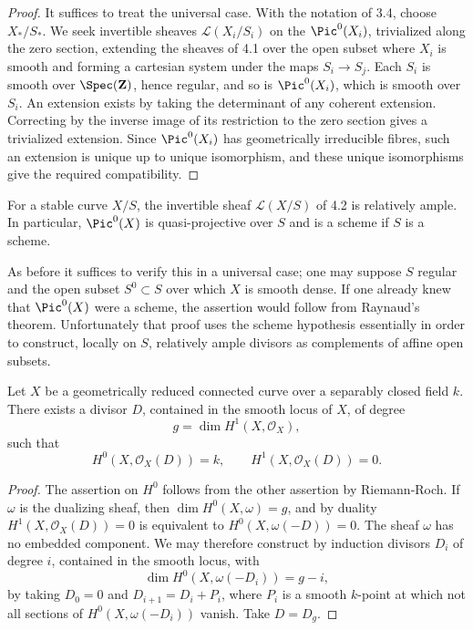 \begin{proof}
It suffices to treat the universal case. With the notation of 3.4, choose $X_*/S_*$. We seek invertible sheaves $\mathcal L(X_i/S_i)$ on the $\Pic^0(X_i)$, trivialized along the zero section, extending the sheaves of 4.1 over the open subset where $X_i$ is smooth and forming a cartesian system under the maps $S_i\to S_j$. Each $S_i$ is smooth over $\Spec(\mathbf Z)$, hence regular, and so is $\Pic^0(X_i)$, which is smooth over $S_i$. An extension exists by taking the determinant of any coherent extension. Correcting by the inverse image of its restriction to the zero section gives a trivialized extension. Since $\Pic^0(X_i)$ has geometrically irreducible fibres, such an extension is unique up to unique isomorphism, and these unique isomorphisms give the required compatibility.
\end{proof}

\begin{proposition}\label{prop:ample}
For a stable curve $X/S$, the invertible sheaf $\mathcal L(X/S)$ of 4.2 is relatively ample. In particular, $\Pic^0(X)$ is quasi-projective over $S$ and is a scheme if $S$ is a scheme.
\end{proposition}

As before it suffices to verify this in a universal case; one may suppose $S$ regular and the open subset $S^0\subset S$ over which $X$ is smooth dense. If one already knew that $\Pic^0(X)$ were a scheme, the assertion would follow from Raynaud's theorem. Unfortunately that proof uses the scheme hypothesis essentially in order to construct, locally on $S$, relatively ample divisors as complements of affine open subsets.

\begin{lemma}\label{lem:divisor}
Let $X$ be a geometrically reduced connected curve over a separably closed field $k$. There exists a divisor $D$, contained in the smooth locus of $X$, of degree
\[
  g=\dim H^1(X,\mathcal O_X),
\]
such that
\[
  H^0(X,\mathcal O_X(D))=k,
  \qquad
  H^1(X,\mathcal O_X(D))=0.
\]
\end{lemma}

\begin{proof}
The assertion on $H^0$ follows from the other assertion by Riemann-Roch. If $\omega$ is the dualizing sheaf, then $\dim H^0(X,\omega)=g$, and by duality $H^1(X,\mathcal O_X(D))=0$ is equivalent to $H^0(X,\omega(-D))=0$. The sheaf $\omega$ has no embedded component. We may therefore construct by induction divisors $D_i$ of degree $i$, contained in the smooth locus, with
\[
  \dim H^0(X,\omega(-D_i))=g-i,
\]
by taking $D_0=0$ and $D_{i+1}=D_i+P_i$, where $P_i$ is a smooth $k$-point at which not all sections of $H^0(X,\omega(-D_i))$ vanish. Take $D=D_g$.
\end{proof}

